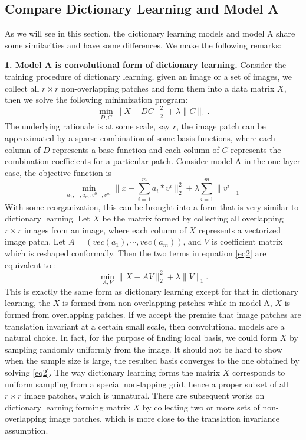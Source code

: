 \documentclass[a4paper]{article}
\begin{document}
\subsection{Compare Dictionary Learning and Model A}
As we will see in this section, the dictionary learning models and model A share some similarities and have some differences. We make the following remarks: 

\textbf{1. Model A is convolutional form of dictionary learning.} Consider the training procedure of dictionary learning, given an image or a set of images, we collect all $r\times r$ non-overlapping patches and form them into a data matrix $X$, then we solve the following minimization program:
\begin{equation}
	\min_{D,C} \|X-DC\|_2^2 + \lambda\|C\|_1.
\end{equation}
The underlying rationale is at some scale, say $r$, the image patch can be approximated by a sparse combination of some basis functions, where each column of $D$ represents a base function and each column of $C$ represents the combination coefficients for a particular patch.
Consider model A in the one layer case, the objective function is 
\begin{equation}
\label{eq2}
	\min_{a_1,\cdots,a_m,v^{0}\cdots ,v^{m}} \|x-\sum_{i=1}^{m} a_i*v^{i}\|_2^2 +\lambda \sum_{i=1}^{m} \|v^{i}\|_1
\end{equation}
With some reorganization, this can be brought into a form that is very similar to dictionary learning. Let $X$ be the matrix formed by collecting all overlapping $r\times r$ images from an image, where each column of $X$ represents a vectorized image patch. Let $A=(vec(a_1),\cdots, vec(a_m))$, and $V$ is coefficient matrix which is reshaped conformally. Then the two terms in equation \eqref{eq2} are equivalent to :
\begin{equation}
	\min_{A,V} \|X-AV\|_2^2+\lambda \|V\|_1.
\end{equation}
This is exactly the same form as dictionary learning except for that in dictionary learning, the $X$ is formed from non-overlapping patches while in model A, $X$ is formed from overlapping patches. If we accept the premise that image patches are translation invariant at a certain small scale, then convolutional models are a natural choice. In fact, for the purpose of finding local basis, we could form $X$ by sampling randomly uniformly from the image. It should not be hard to show when the sample size is large, the resulted basis converges to the one obtained by solving \eqref{eq2}. The way dictionary learning forms the matrix $X$ corresponds to uniform sampling from a special non-lapping grid, hence a proper subset of all $r\times r$ image patches, which is unnatural. There are subsequent works on dictionary learning forming matrix $X$ by collecting two or more sets of non-overlapping image patches, which is more close to the translation invariance assumption.
\end{document}
